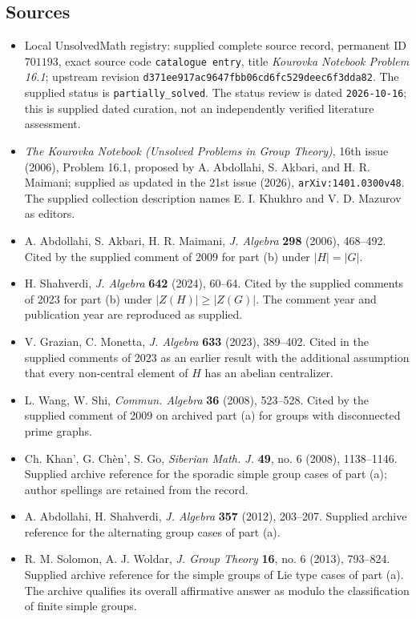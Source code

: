 \documentclass[11pt]{article}
\begin{document}
\subsection{Sources}
\begin{itemize}
\item Local UnsolvedMath registry: supplied complete source record, permanent ID \(701193\), exact source code \texttt{catalogue entry}, title \emph{Kourovka Notebook Problem 16.1}; upstream revision \texttt{d371ee917ac9647fbb06cd6fc529deec6f3dda82}. The supplied status is \texttt{partially\_solved}. The status review is dated \texttt{2026-10-16}; this is supplied dated curation, not an independently verified literature assessment.
\item \emph{The Kourovka Notebook (Unsolved Problems in Group Theory)}, 16th issue (2006), Problem 16.1, proposed by A. Abdollahi, S. Akbari, and H. R. Maimani; supplied as updated in the 21st issue (2026), \texttt{arXiv:1401.0300v48}. The supplied collection description names E. I. Khukhro and V. D. Mazurov as editors.
\item A. Abdollahi, S. Akbari, H. R. Maimani, \emph{J. Algebra} \textbf{298} (2006), 468--492. Cited by the supplied comment of 2009 for part (b) under \(|H|=|G|\).
\item H. Shahverdi, \emph{J. Algebra} \textbf{642} (2024), 60--64. Cited by the supplied comments of 2023 for part (b) under \(|Z(H)|\geq |Z(G)|\). The comment year and publication year are reproduced as supplied.
\item V. Grazian, C. Monetta, \emph{J. Algebra} \textbf{633} (2023), 389--402. Cited in the supplied comments of 2023 as an earlier result with the additional assumption that every non-central element of \(H\) has an abelian centralizer.
\item L. Wang, W. Shi, \emph{Commun. Algebra} \textbf{36} (2008), 523--528. Cited by the supplied comment of 2009 on archived part (a) for groups with disconnected prime graphs.
\item Ch. Khan', G. Ch\`en', S. Go, \emph{Siberian Math. J.} \textbf{49}, no. 6 (2008), 1138--1146. Supplied archive reference for the sporadic simple group cases of part (a); author spellings are retained from the record.
\item A. Abdollahi, H. Shahverdi, \emph{J. Algebra} \textbf{357} (2012), 203--207. Supplied archive reference for the alternating group cases of part (a).
\item R. M. Solomon, A. J. Woldar, \emph{J. Group Theory} \textbf{16}, no. 6 (2013), 793--824. Supplied archive reference for the simple groups of Lie type cases of part (a). The archive qualifies its overall affirmative answer as modulo the classification of finite simple groups.
\end{itemize}
\end{document}
